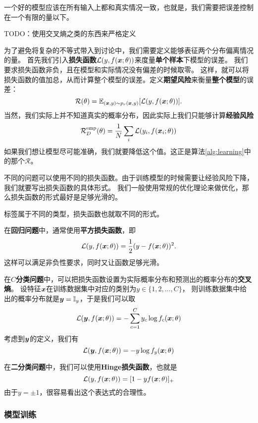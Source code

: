 \documentclass[UTF8, a4paper]{ctexart}
\begin{document}
一个好的模型应该在所有输入上都和真实情况一致，也就是，我们需要把误差控制在一个有限的量以下。

TODO：使用交叉熵之类的东西来严格定义

为了避免将复杂的不等式带入到讨论中，我们需要定义能够表征两个分布偏离情况的量。
首先我们引入\textbf{损失函数}$\mathcal{L}(y, f(\vb*{x};\theta))$来度量\textbf{单个样本}下模型的误差。
我们要求损失函数非负，且在模型和实际情况没有偏差的时候取零。
这样，就可以将损失函数的值加总，从而计算整个模型的误差。定义\textbf{期望风险}来衡量\textbf{整个模型}的误差：
\begin{equation}
    \mathcal{R}(\theta) = \mathbb{E}_{(\vb*{x}, y) \sim p_r (\vb*{x}, y)}[\mathcal{L}(y, f(\vb*{x};\theta))].
\end{equation}
当然，我们实际上并不知道真实的概率分布，因此实际上我们只能够计算\textbf{经验风险}
\begin{equation}
    \mathcal{R}_D^\text{emp}(\theta) = \frac{1}{N} \sum_i \mathcal{L}(y_i, f(\vb*{x}_i;\theta))
\end{equation}
如果我们想让模型尽可能准确，我们就要降低这个值。这正是算法\ref{alg:learning}中的那个$\mathcal{R}$。

不同的问题可以使用不同的损失函数。由于训练模型的时候需要让经验风险下降，我们就要写出损失函数的具体形式。
我们一般使用常规的优化理论来做优化，那么损失函数的形式最好是足够光滑的。

标签属于不同的类型，损失函数也就取不同的形式。

在\textbf{回归问题}中，通常使用\textbf{平方损失函数}，即 
\begin{equation}
    \mathcal{L}(y, f(\vb*{x};\theta)) = \frac{1}{2} (y-f(\vb*{x};\theta))^2.
\end{equation}
这样可以满足非负性要求，同时又让函数足够光滑。

在$C$\textbf{分类问题}中，可以把损失函数设置为实际概率分布和预测出的概率分布的\textbf{交叉熵}。
设特征$\vb*{x}$在训练数据集中对应的类别为$y\in \{1, 2, \ldots, C\}$，
则训练数据集中给出的概率分布就是$\vb*{y}=\mathbb{I}_y$，于是我们可以取
\[
\mathcal{L}(\vb*{y}, f(\vb*{x};\theta)) = - \sum_{c=1}^C y_c \log f_c(\vb*{x};\theta)
\]
考虑到$\vb*{y}$的定义，我们有
\[
\mathcal{L}(\vb*{y}, f(\vb*{x};\theta)) = - y \log f_y (\vb*{x};\theta)
\]

在\textbf{二分类问题}中，我们可以使用\textbf{Hinge损失函数}，也就是
\[
\mathcal{L}(y, f(\vb*{x};\theta)) = [1-yf(\vb*{x};\theta)]_+
\]
由于$y=\pm 1$，很容易看出这个表达式的合理性。

\subsubsection{模型训练}
\end{document}
